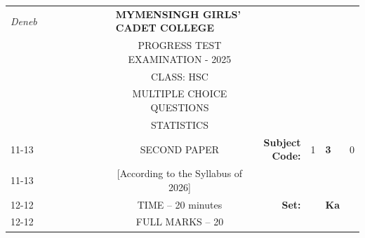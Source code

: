 \documentclass[12pt]{exam}
\begin{document}
\begin{table}[]
\begin{tabular}{llllllllcllll}
\textit{Deneb} &  &  &  &  &  &  &  & \multicolumn{1}{l}{\textbf{MYMENSINGH GIRLS' CADET COLLEGE}} &                                             &                        &                                 &                        \\
                &  &  &  &  &  &  &  & \multicolumn{1}{c}{PROGRESS TEST EXAMINATION - 2025}       &                                             &                        & \multicolumn{1}{c}{}            &                        \\
                &  &  &  &  &  &  &  & CLASS: HSC                                                   &                                             &                        & \multicolumn{1}{c}{}            &                        \\
                &  &  &  &  &  &  &  & MULTIPLE CHOICE QUESTIONS                                    &                                             &                        & \multicolumn{1}{c}{}            &                        \\
                &  &  &  &  &  &  &  & STATISTICS                                                   &                                             &                        & \multicolumn{1}{r}{}            &                        \\ \cline{11-13} 
                &  &  &  &  &  &  &  & SECOND PAPER                                                 & \multicolumn{1}{r|}{\textbf{Subject Code:}} & \multicolumn{1}{l|}{1} & \multicolumn{1}{l|}{\textbf{3}} & \multicolumn{1}{l|}{0} \\ \cline{11-13} 
                &  &  &  &  &  &  &  & [According to the Syllabus of 2026]                          & \multicolumn{1}{r}{}                        &                        &                                 &                        \\ \cline{12-12}
                &  &  &  &  &  &  &  & TIME – 20 minutes                                            & \multicolumn{1}{r}{\textbf{Set:}}           & \multicolumn{1}{l|}{}  & \multicolumn{1}{l|}{\textbf{Ka}} &                        \\ \cline{12-12}
                &  &  &  &  &  &  &  & FULL MARKS – 20                                              &                                             &                        &                                 &                       
\end{tabular}
\end{table}
\end{document}
